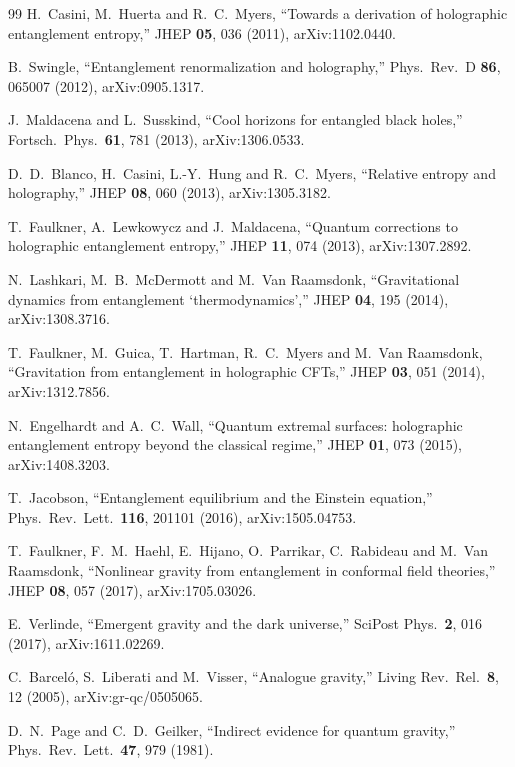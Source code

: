 \documentclass[11pt]{article}
\theoremstyle{definition}
\begin{document}
\begin{thebibliography}{99}
H.~Casini, M.~Huerta and R.~C.~Myers, ``Towards a derivation of holographic
entanglement entropy,'' JHEP \textbf{05}, 036 (2011), arXiv:1102.0440.

B.~Swingle, ``Entanglement renormalization and holography,''
Phys.\ Rev.\ D \textbf{86}, 065007 (2012), arXiv:0905.1317.

J.~Maldacena and L.~Susskind, ``Cool horizons for entangled black holes,''
Fortsch.\ Phys.\ \textbf{61}, 781 (2013), arXiv:1306.0533.

D.~D.~Blanco, H.~Casini, L.-Y.~Hung and R.~C.~Myers, ``Relative entropy and
holography,'' JHEP \textbf{08}, 060 (2013), arXiv:1305.3182.

T.~Faulkner, A.~Lewkowycz and J.~Maldacena, ``Quantum corrections to
holographic entanglement entropy,'' JHEP \textbf{11}, 074 (2013),
arXiv:1307.2892.

N.~Lashkari, M.~B.~McDermott and M.~Van Raamsdonk, ``Gravitational dynamics
from entanglement `thermodynamics','' JHEP \textbf{04}, 195 (2014),
arXiv:1308.3716.

T.~Faulkner, M.~Guica, T.~Hartman, R.~C.~Myers and M.~Van Raamsdonk,
``Gravitation from entanglement in holographic CFTs,''
JHEP \textbf{03}, 051 (2014), arXiv:1312.7856.

N.~Engelhardt and A.~C.~Wall, ``Quantum extremal surfaces: holographic
entanglement entropy beyond the classical regime,''
JHEP \textbf{01}, 073 (2015), arXiv:1408.3203.

T.~Jacobson, ``Entanglement equilibrium and the Einstein equation,''
Phys.\ Rev.\ Lett.\ \textbf{116}, 201101 (2016), arXiv:1505.04753.

T.~Faulkner, F.~M.~Haehl, E.~Hijano, O.~Parrikar, C.~Rabideau and
M.~Van Raamsdonk, ``Nonlinear gravity from entanglement in conformal field
theories,'' JHEP \textbf{08}, 057 (2017), arXiv:1705.03026.

E.~Verlinde, ``Emergent gravity and the dark universe,''
SciPost Phys.\ \textbf{2}, 016 (2017), arXiv:1611.02269.

C.~Barcel\'o, S.~Liberati and M.~Visser, ``Analogue gravity,''
Living Rev.\ Rel.\ \textbf{8}, 12 (2005), arXiv:gr-qc/0505065.

D.~N.~Page and C.~D.~Geilker, ``Indirect evidence for quantum gravity,''
Phys.\ Rev.\ Lett.\ \textbf{47}, 979 (1981).


\end{thebibliography}
\end{document}
